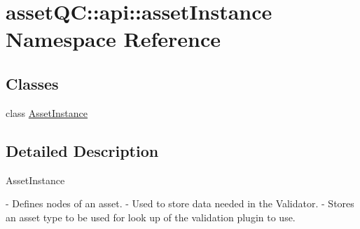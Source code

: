 \hypertarget{namespaceassetQC_1_1api_1_1assetInstance}{\section{asset\-Q\-C\-:\-:api\-:\-:asset\-Instance \-Namespace \-Reference}
\label{d0/d8d/namespaceassetQC_1_1api_1_1assetInstance}
}
\subsection*{\-Classes}
\begin{DoxyCompactItemize}
\item 
class \hyperlink{classassetQC_1_1api_1_1assetInstance_1_1AssetInstance}{\-Asset\-Instance}
\end{DoxyCompactItemize}


\subsection{\-Detailed \-Description}
\begin{DoxyVerb}
AssetInstance

- Defines nodes of an asset.
- Used to store data needed in the Validator.
- Stores an asset type to be used for look up of the validation plugin to use.
\end{DoxyVerb}
 